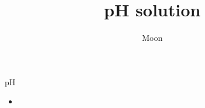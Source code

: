 \documentclass[notheorems,xcolor=dvipsnames]{beamer}
\title{pH solution}
\author{Moon}
\theoremstyle{definition}
\begin{document}
\begin{frame}
  \titlepage
\end{frame}



\begin{frame}{\LARGE pH}
  \begin{itemize}
    \item 
  \end{itemize}
\end{frame}

%

\end{document}
